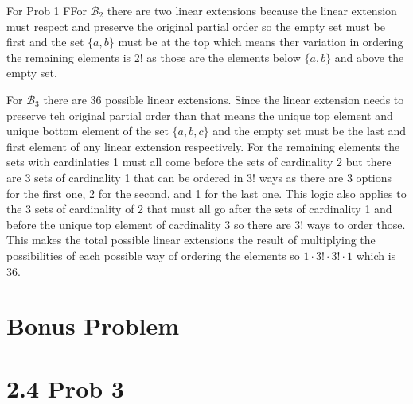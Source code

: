 \documentclass{report}
\begin{document}
\begin{RemarkWithLily}{For Prob 1}
  FFor $\mathcal{B}_2$ there are two linear extensions because the linear extension must respect and preserve the original partial order 
  so the empty set must be first and the set $\{a,b\}$ must be at the top which means ther variation in ordering the remaining elements is $2!$ as those are the elements below 
  $\{a,b\}$ and above the empty set. 

  \medskip

  For $\mathcal{B}_{3}$ there are 36 possible linear extensions. Since the linear extension needs to preserve teh original 
  partial order than that means the unique top element and unique bottom element of the set $\{a,b,c\}$ and the empty set must be the last and first 
  element of any linear extension respectively. For the remaining elements the sets with cardinlaties 1 must all come before the sets of cardinality 2 
  but there are $3$ sets of cardinality 1 that can be ordered in $3!$ ways as there are 3 options for the first one, 2 for the second, and 1 for the last one. 
  This logic also applies to the 3 sets of cardinality of 2 that must all go after the sets of cardinality 1 and before the unique top element of 
  cardinality 3 so there are $3!$ ways to order those. This makes the total possible linear extensions the result of 
  multiplying the possibilities of each possible way of ordering the elements so $1 \cdot 3! \cdot 3! \cdot 1$ which is $36$. 
\end{RemarkWithLily}




\section*{Bonus Problem}



\newpage 

\section*{2.4 Prob 3}

\end{document}
